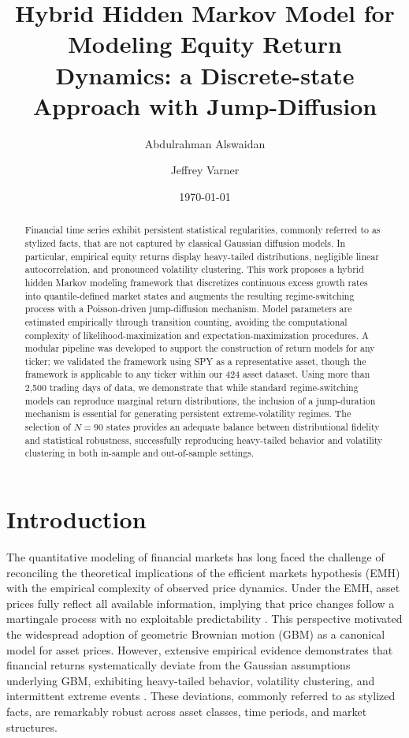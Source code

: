 \documentclass[11pt, letterpaper]{article}
\title{\textbf{Hybrid Hidden Markov Model for Modeling Equity Return Dynamics: a Discrete-state Approach with Jump-Diffusion}}
\author{Abdulrahman Alswaidan}
\author{Jeffrey Varner}
\affil{Cornell University, Ithaca, NY 14850}
\date{\today}
\begin{document}
\maketitle

\begin{abstract}
\noindent Financial time series exhibit persistent statistical regularities, commonly referred to as stylized facts, that are not captured by classical Gaussian diffusion models. In particular, empirical equity returns display heavy-tailed distributions, negligible linear autocorrelation, and pronounced volatility clustering. This work proposes a hybrid hidden Markov modeling framework that discretizes continuous excess growth rates into quantile-defined market states and augments the resulting regime-switching process with a Poisson-driven jump-diffusion mechanism. Model parameters are estimated empirically through transition counting, avoiding the computational complexity of likelihood-maximization and expectation-maximization procedures. A modular pipeline was developed to support the construction of return models for any ticker; we validated the framework using SPY as a representative asset, though the framework is applicable to any ticker within our 424 asset dataset. Using more than 2,500 trading days of data, we demonstrate that while standard regime-switching models can reproduce marginal return distributions, the inclusion of a jump-duration mechanism is essential for generating persistent extreme-volatility regimes. The selection of $N=90$ states provides an adequate balance between distributional fidelity and statistical robustness, successfully reproducing heavy-tailed behavior and volatility clustering in both in-sample and out-of-sample settings.
\end{abstract}

\section{Introduction}

The quantitative modeling of financial markets has long faced the challenge of reconciling the theoretical implications of the efficient markets hypothesis (EMH) with the empirical complexity of observed price dynamics. Under the EMH, asset prices fully reflect all available information, implying that price changes follow a martingale process with no exploitable predictability \cite{fama_efficient_1970}. This perspective motivated the widespread adoption of geometric Brownian motion (GBM) as a canonical model for asset prices. However, extensive empirical evidence demonstrates that financial returns systematically deviate from the Gaussian assumptions underlying GBM, exhibiting heavy-tailed behavior, volatility clustering, and intermittent extreme events \cite{mandelbrot_variation_1963, cont_empirical_2001}. These deviations, commonly referred to as stylized facts, are remarkably robust across asset classes, time periods, and market structures.
\end{document}
